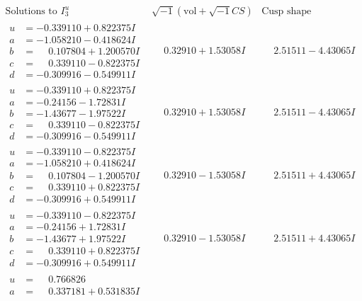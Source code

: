 \documentclass[1p]{elsarticle_modified}
\theoremstyle{definition}
\newcommand{\I}{\sqrt{-1}}
\begin{document}
$$\begin{array}{c|c|c}  
\text{Solutions to }I^u_{3}& \I (\text{vol} + \sqrt{-1}CS) & \text{Cusp shape}\\
 \hline 
\begin{aligned}
u &= -0.339110 + 0.822375 I \\
a &= -1.058210 - 0.418624 I \\
b &= \phantom{-}0.107804 + 1.200570 I \\
c &= \phantom{-}0.339110 - 0.822375 I \\
d &= -0.309916 - 0.549911 I\end{aligned}
 & \phantom{-}0.32910 + 1.53058 I & \phantom{-}2.51511 - 4.43065 I \\ \hline\begin{aligned}
u &= -0.339110 + 0.822375 I \\
a &= -0.24156 - 1.72831 I \\
b &= -1.43677 - 1.97522 I \\
c &= \phantom{-}0.339110 - 0.822375 I \\
d &= -0.309916 - 0.549911 I\end{aligned}
 & \phantom{-}0.32910 + 1.53058 I & \phantom{-}2.51511 - 4.43065 I \\ \hline\begin{aligned}
u &= -0.339110 - 0.822375 I \\
a &= -1.058210 + 0.418624 I \\
b &= \phantom{-}0.107804 - 1.200570 I \\
c &= \phantom{-}0.339110 + 0.822375 I \\
d &= -0.309916 + 0.549911 I\end{aligned}
 & \phantom{-}0.32910 - 1.53058 I & \phantom{-}2.51511 + 4.43065 I \\ \hline\begin{aligned}
u &= -0.339110 - 0.822375 I \\
a &= -0.24156 + 1.72831 I \\
b &= -1.43677 + 1.97522 I \\
c &= \phantom{-}0.339110 + 0.822375 I \\
d &= -0.309916 + 0.549911 I\end{aligned}
 & \phantom{-}0.32910 - 1.53058 I & \phantom{-}2.51511 + 4.43065 I \\ \hline\begin{aligned}
u &= \phantom{-}0.766826\phantom{ +0.000000I} \\
a &= \phantom{-}0.337181 + 0.531835 I \\

\end{aligned}
\end{array}$$
\end{document}
